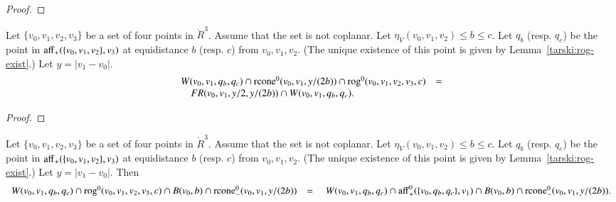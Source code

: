 \begin{tarskidata}
\begin{tarski}
\begin{proof}
\end{proof}
\end{tarski}





\begin{tarski}

\begin{lemma}
Let $\{v_0,v_1,v_2,v_3\}$ be a set of four points in $\ring{R}^3$.
Assume that the set is not coplanar.
Let $\eta_V(v_0,v_1,v_2)\le b \le c$.  
Let $q_b$ (resp. $q_c$) be the point
in ${\operatorname{aff}}_+(\{v_0,v_1,v_2\},v_3)$ at equidistance $b$ (resp. $c$)
from $v_0,v_1,v_2$.  (The unique existence of this point is given
by Lemma~\ref{tarski:rog-exist}.)   Let $y = |v_1-v_0|$.
$$
\begin{array}{lll}
W(v_0,v_1,q_b,q_c) \cap {\operatorname{rcone}}^0(v_0,v_1,y/(2b))
\cap {\operatorname{rog}}^0(v_0,v_1,v_2,v_3,c) &=\\
\quad FR(v_0,v_1,y/2,y/(2b))\cap W(v_0,v_1,q_b,q_c).
\end{array}
$$
\end{lemma}

\begin{proof}
\end{proof}
\end{tarski}





\begin{tarski}

\begin{lemma}
Let $\{v_0,v_1,v_2,v_3\}$ be a set of four points in $\ring{R}^3$.
Assume that the set is not coplanar.
Let $\eta_V(v_0,v_1,v_2)\le b \le c$.  
Let $q_b$ (resp. $q_c$) be the point
in ${\operatorname{aff}}_+(\{v_0,v_1,v_2\},v_3)$ at equidistance $b$ (resp. $c$)
from $v_0,v_1,v_2$.  (The unique existence of this point is given
by Lemma~\ref{tarski:rog-exist}.)   Let $y = |v_1-v_0|$.
Then
$$
\begin{array}{lll}
W(v_0,v_1,q_b,q_c)  \cap {\operatorname{rog}}^0(v_0,v_1,v_2,v_3,c)\cap
B(v_0,b) \cap {\operatorname{rcone}}_-^0(v_0,v_1,y/(2b)) &=
\quad
W(v_0,v_1,q_b,q_c)  \cap {\operatorname{aff}}_+^0(\{v_0,q_b,q_c\},v_1)\cap
B(v_0,b) \cap {\operatorname{rcone}}_-^0(v_0,v_1,y/(2b)).
\end{array}
$$
\end{lemma}


\end{tarski}
\end{tarskidata}
